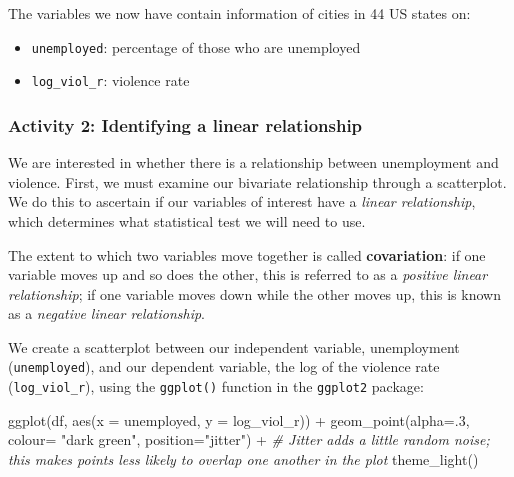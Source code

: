\documentclass[
]{book}
\newenvironment{Shaded}{\begin{snugshade}}{\end{snugshade}}
\newcommand{\AttributeTok}[1]{\textcolor[rgb]{0.77,0.63,0.00}{#1}}
\newcommand{\CommentTok}[1]{\textcolor[rgb]{0.56,0.35,0.01}{\textit{#1}}}
\newcommand{\DecValTok}[1]{\textcolor[rgb]{0.00,0.00,0.81}{#1}}
\newcommand{\FunctionTok}[1]{\textcolor[rgb]{0.00,0.00,0.00}{#1}}
\newcommand{\NormalTok}[1]{#1}
\newcommand{\SpecialCharTok}[1]{\textcolor[rgb]{0.00,0.00,0.00}{#1}}
\newcommand{\StringTok}[1]{\textcolor[rgb]{0.31,0.60,0.02}{#1}}
\providecommand{\tightlist}{%
  \setlength{\itemsep}{0pt}\setlength{\parskip}{0pt}}
\begin{document}
The variables we now have contain information of cities in 44 US states on:

\begin{itemize}
\tightlist
\item
  \texttt{unemployed}: percentage of those who are unemployed
\item
  \texttt{log\_viol\_r}: violence rate
\end{itemize}

\hypertarget{activity-2-identifying-a-linear-relationship}{%
\subsubsection{Activity 2: Identifying a linear relationship}\label{activity-2-identifying-a-linear-relationship}}

We are interested in whether there is a relationship between unemployment and violence. First, we must examine our bivariate relationship through a scatterplot. We do this to ascertain if our variables of interest have a \emph{linear relationship}, which determines what statistical test we will need to use.

The extent to which two variables move together is called \textbf{covariation}: if one variable moves up and so does the other, this is referred to as a \emph{positive linear relationship}; if one variable moves down while the other moves up, this is known as a \emph{negative linear relationship}.

We create a scatterplot between our independent variable, unemployment (\texttt{unemployed}), and our dependent variable, the log of the violence rate (\texttt{log\_viol\_r}), using the \texttt{ggplot()} function in the \texttt{ggplot2} package:

\begin{Shaded}
\begin{Highlighting}[]
\FunctionTok{ggplot}\NormalTok{(df, }\FunctionTok{aes}\NormalTok{(}\AttributeTok{x =}\NormalTok{ unemployed, }\AttributeTok{y =}\NormalTok{ log\_viol\_r)) }\SpecialCharTok{+} 
  \FunctionTok{geom\_point}\NormalTok{(}\AttributeTok{alpha=}\NormalTok{.}\DecValTok{3}\NormalTok{, }\AttributeTok{colour=} \StringTok{"dark green"}\NormalTok{, }\AttributeTok{position=}\StringTok{"jitter"}\NormalTok{) }\SpecialCharTok{+} \CommentTok{\# Jitter adds a little random noise; this makes points less likely to overlap one another in the plot}
  \FunctionTok{theme\_light}\NormalTok{()}
\end{Highlighting}
\end{Shaded}
\end{document}
